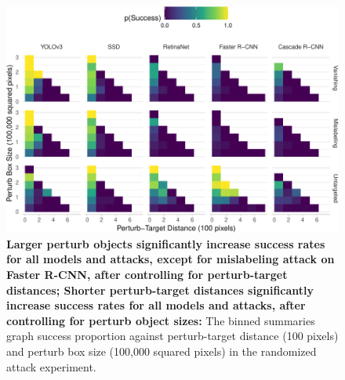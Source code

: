\begin{figure}[tb]

{\centering \includegraphics{rmd_imgs/perturb_bbox_and_object_dist_graph-1} 

}

\caption{\textbf{Larger perturb objects significantly increase success rates for all models and attacks, except for mislabeling attack on Faster R-CNN, after controlling for perturb-target distances; Shorter perturb-target distances significantly increase success rates for all models and attacks, after controlling for perturb object sizes:}  The binned summaries graph success proportion against perturb-target distance (100 pixels) and perturb box size (100,000 squared pixels) in the randomized attack experiment.}\label{fig:perturb_bbox_and_object_dist_graph}
\end{figure}

\begingroup\fontsize{9}{11}\selectfont

